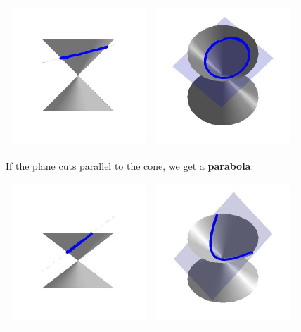 \documentclass[nooutcomes]{ximera}
\begin{document}
\begin{center}

\begin{tabular}{cc}

\includegraphics[width=2in]{./ConicsGraphics/Ellipse01.jpg} & \includegraphics[width=2in]{./ConicsGraphics/Ellipse02.jpg} \\

\end{tabular}

\end{center}

If the plane cuts parallel to the cone, we get a  \textbf{parabola}.

\begin{center}

\begin{tabular}{cc}

\includegraphics[width=2in]{./ConicsGraphics/Parabola01.jpg} & \includegraphics[width=2in]{./ConicsGraphics/Parabola02.jpg} \\

\end{tabular}

\end{center}
\end{document}
